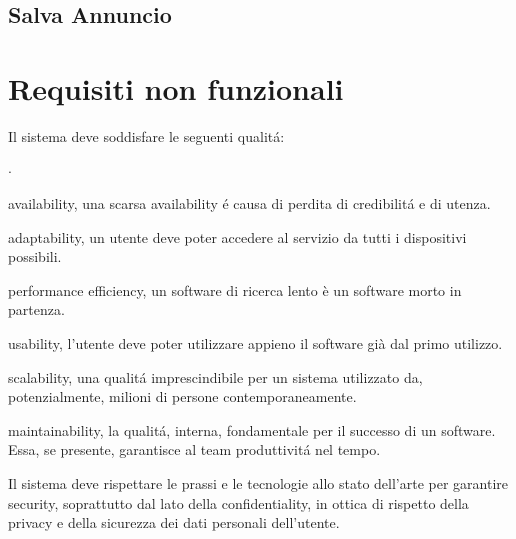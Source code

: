 \subsection{Salva Annuncio}


\section{Requisiti non funzionali}
Il sistema deve soddisfare le seguenti qualitá:
\begin{list}{$\cdot$}{}
    \item availability, una scarsa availability é causa di perdita di 
    credibilitá e di utenza.
    \item adaptability, un utente deve poter accedere al servizio da tutti 
    i dispositivi possibili.
    \item performance efficiency, un software di ricerca lento è un software 
    morto in partenza.
    \item usability, l'utente deve poter utilizzare appieno il software già 
    dal primo utilizzo.
    \item scalability, una qualitá imprescindibile per un sistema utilizzato 
    da, potenzialmente, milioni di persone contemporaneamente.
    \item maintainability, la qualitá, interna, fondamentale per il successo 
    di un software. Essa, se presente, garantisce al team produttivitá nel tempo.
\end{list}

Il sistema deve rispettare le prassi e le tecnologie allo stato dell'arte per 
garantire security, soprattutto dal lato della confidentiality, in ottica di 
rispetto della privacy e della sicurezza dei dati personali dell'utente.

